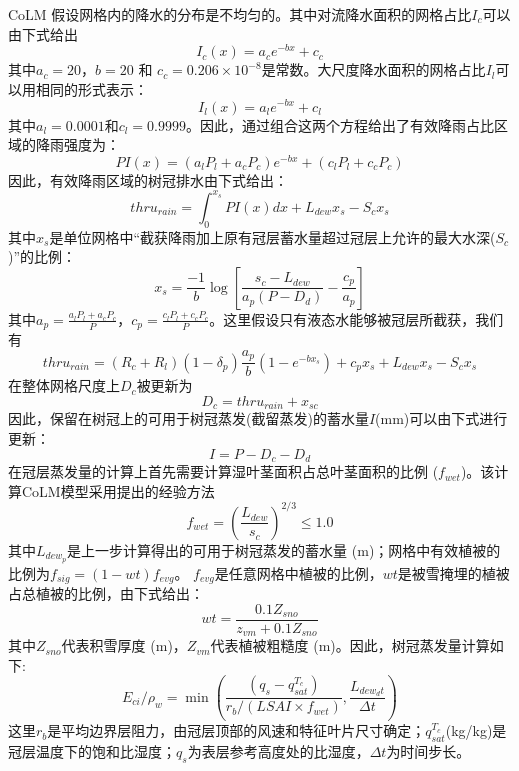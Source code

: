 CoLM 假设网格内的降水的分布是不均匀的。其中对流降水面积的网格占比$I_c$可以由下式给出
\begin{equation}
I_{c}(x)=a_{c} e^{-b x}+c_{c}
\end{equation}
其中$a_c=20$，$b=20$ 和 $c_c=0.206\times10^{-8}$是常数。大尺度降水面积的网格占比$I_l$可以用相同的形式表示：
\begin{equation}
I_{l}(x)=a_{l} e^{-b x}+c_{l}
\end{equation}
其中$a_l=0.0001$和$c_l=0.9999$。因此，通过组合这两个方程给出了有效降雨占比区域的降雨强度为：
\begin{equation}
P I(x)=\left(a_{l} P_{l}+a_{c} P_{c}\right) e^{-b x}+\left(c_{l} P_{l}+c_{c} P_{c}\right)
\end{equation}
因此，有效降雨区域的树冠排水由下式给出：
\begin{equation}
t h r u_{ {rain }}=\int_{0}^{x_{s}} P I(x) d x+L_{d e w} x_{s}-S_{c} x_{s}
\end{equation}
其中$x_s$是单位网格中“截获降雨加上原有冠层蓄水量超过冠层上允许的最大水深($S_c$)”的比例：
\begin{equation}
x_{s}=\frac{-1}{b} \log \left[\frac{s_{c}-L_{d e w}}{a_{p}\left(P-D_{d}\right)}-\frac{c_{p}}{a_{p}}\right]
\end{equation}
其中$a_p=\frac{a_lP_l+a_cP_c}{P}$，$c_p=\frac{c_lP_l+c_cP_c}{P}$。这里假设只有液态水能够被冠层所截获，我们有
\begin{equation}
t h r u_{ {rain }}=\left(R_{c}+R_{l}\right)\left(1-\delta_{p}\right) \frac{a_{p}}{b}\left(1-e^{-b x_{s}}\right)+c_{p} x_{s}+L_{d e w} x_{s}-S_{c} x_{s}
\end{equation}
在整体网格尺度上$D_c$被更新为
\begin{equation}
D_c=thru_{r a i n}+x_{s c}
\end{equation}
因此，保留在树冠上的可用于树冠蒸发(截留蒸发)的蓄水量$I$(mm)可以由下式进行更新：
\begin{equation}
I={P}-D_{c}-D_{d}
\end{equation}
在冠层蒸发量的计算上首先需要计算湿叶茎面积占总叶茎面积的比例 ($f_{wet}$)。该计算CoLM模型采用\citet{dickinson1993biosphere}提出的经验方法
\begin{equation}
f_{{wet}}=\left(\frac{L_{d e w}}{s_{c}}\right)^{2 / 3} \leq 1.0
\end{equation}
其中$L_{dew_p}$是上一步计算得出的可用于树冠蒸发的蓄水量 (m)；网格中有效植被的比例为$f_{sig}=\left(1-wt\right)f_{evg}$。
$f_{evg}$是任意网格中植被的比例，$wt$是被雪掩埋的植被占总植被的比例，由下式给出：
\begin{equation}
w t=\frac{0.1 Z_{sno}}{z_{vm}+0.1 Z_{sno}}
\end{equation}
其中$Z_{sno}$代表积雪厚度 (m)，$Z_{vm}$代表植被粗糙度 (m)。因此，树冠蒸发量计算如下:
\begin{equation}
E_{ci} / \rho_{w}=\min \left(\frac{\left(q_{s}-q_{sat}^{T_{c}}\right)}{r_{b} /\left(LSAI \times f_{wet}\right)}, \frac{L_{dew_{d} t}}{\Delta t}\right)
\end{equation}
这里$r_b$是平均边界层阻力，由冠层顶部的风速和特征叶片尺寸确定；$q_{sat}^{T_c} $(kg/kg)是冠层温度下的饱和比湿度；$q_s$为表层参考高度处的比湿度，$\Delta t$为时间步长。


